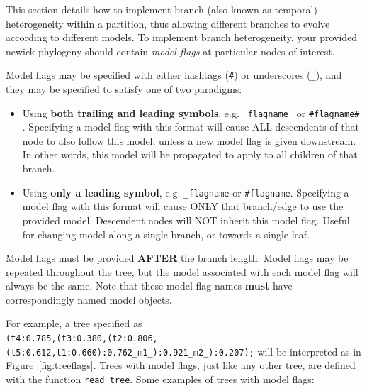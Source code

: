 \documentclass{article}
\newcommand{\code}[1]{\texttt{\small{#1}}}
\begin{document}
This section details how to implement branch (also known as temporal) heterogeneity within a partition, thus allowing different branches to evolve according to different models. To implement branch heterogeneity, your provided newick phylogeny should contain \emph{model flags} at particular nodes of interest.

Model flags may be specified with either hashtags (\code{\#}) or underscores (\code{\_}), and they may be specified to satisfy one of two paradigms:
\begin{itemize}
\item Using \textbf{both trailing and leading symbols}, e.g. \code{\_flagname\_} or \code{\#flagname\#} . Specifying a model flag with this format will cause ALL descendents of that node to also follow this model, unless a new model flag is given downstream. In other words, this model will be propagated to apply to all children of that branch.
\item Using \textbf{only a leading symbol}, e.g. \code{\_flagname} or \code{\#flagname}. Specifying a model flag with this format will cause ONLY that branch/edge to use the provided model. Descendent nodes will NOT inherit this model flag. Useful for changing model along a single branch, or towards a single leaf.
\end{itemize}
Model flags must be provided \textbf{AFTER} the branch length.
Model flags may be repeated throughout the tree, but the model associated with each model flag will always be the same. Note that these model flag names \textbf{must} have correspondingly named model objects.

For example, a tree specified as  \\ \texttt{\normalsize{(t4:0.785,(t3:0.380,(t2:0.806,(t5:0.612,t1:0.660):0.762\_m1\_):0.921\_m2\_):0.207);}} will be interpreted as in Figure~\ref{fig:treeflags}. Trees with model flags, just like any other tree, are defined with the function \code{read\_tree}. Some examples of trees with model flags:
\end{document}
